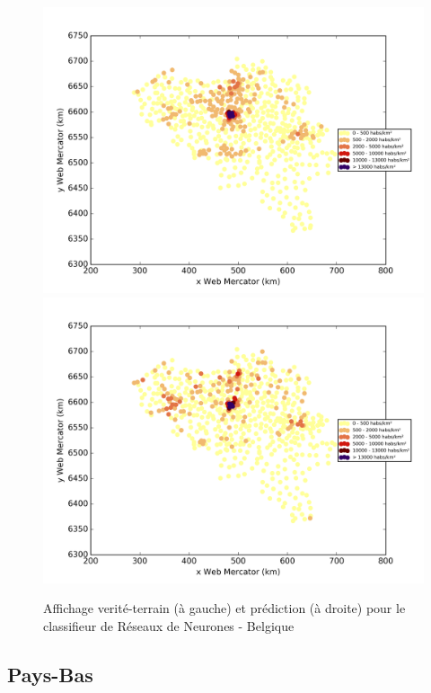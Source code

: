\documentclass{book}
\begin{document}
\begin{figure}[H]
\centerline{
\includegraphics[scale=0.5]{../../data/Belgique/test/Neural_Network_Classification-oversampling/Neural_Network_Classification-oversampling/density_ground_truth.png}
\includegraphics[scale=0.5]{../../data/Belgique/test/Neural_Network_Classification-oversampling/Neural_Network_Classification-oversampling/density_classification.png}
}
\caption{Affichage verité-terrain (à gauche) et prédiction (à droite) pour le classifieur de Réseaux de Neurones - Belgique}
\label{nn_carte_belgique}
\end{figure}


\subsection{Pays-Bas}
\end{document}
